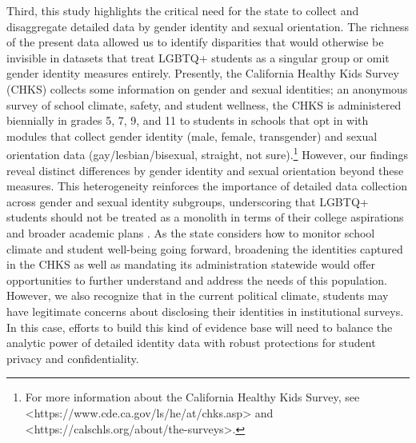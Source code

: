 Third, this study highlights the critical need for the state to collect
and disaggregate detailed data by gender identity and sexual
orientation. The richness of the present data allowed us to identify
disparities that would otherwise be invisible in datasets that treat
LGBTQ+ students as a singular group or omit gender identity measures
entirely. Presently, the California Healthy Kids Survey (CHKS) collects
some information on gender and sexual identities; an anonymous survey of
school climate, safety, and student wellness, the CHKS is administered
biennially in grades 5, 7, 9, and 11 to students in schools that opt in
with modules that collect gender identity (male, female, transgender)
and sexual orientation data (gay/lesbian/bisexual, straight, not
sure).\footnote{For more information about the California Healthy Kids Survey, see <https://www.cde.ca.gov/ls/he/at/chks.asp> and <https://calschls.org/about/the-surveys>.} However, our findings reveal distinct differences by gender
identity and sexual orientation beyond these measures. This
heterogeneity reinforces the importance of detailed data collection
across gender and sexual identity subgroups, underscoring that LGBTQ+
students should not be treated as a monolith in terms of their college
aspirations and broader academic plans \citep{feldman2022a}. As the
state considers how to monitor school climate and student well-being
going forward, broadening the identities captured in the CHKS as well as
mandating its administration statewide would offer opportunities to
further understand and address the needs of this population. However, we
also recognize that in the current political climate, students may have
legitimate concerns about disclosing their identities in institutional
surveys. In this case, efforts to build this kind of evidence base will
need to balance the analytic power of detailed identity data with robust
protections for student privacy and confidentiality.


